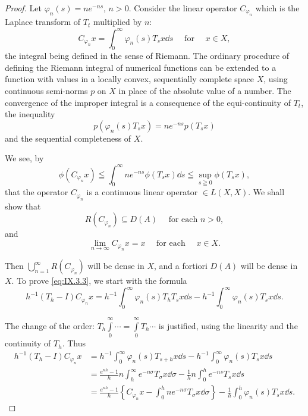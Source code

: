 \begin{proof}
 Let $\varphi_{n}(s) = ne^{-ns}$, $n > 0$. Consider the linear operator $C_{\varphi_n}$ which is the Laplace transform of $T_{t}$ multiplied by $n$: 
\begin{equation}\label{eq:IX.3.2}
C _ {\varphi_{n}} x = \int_{0} ^{\infty} \varphi_{n} (s) T _{s} x \dd s \quad \text{ for } \quad x \in X,
\end{equation}
the integral being defined in the sense of Riemann. The ordinary procedure of defining the Riemann integral of numerical functions can be extended to a function with values in a locally convex, sequentially complete space $X$, using continuous semi-norms $p$ on $X$ in place of the absolute value of a number. The convergence of the improper integral is a consequence of the equi-continuity of $T_{t}$, the inequality 
\[
p \left(\varphi_{n} (s) T _{s} x\right) = n e ^{-ns} p \left(T _{s} x\right)
\]
and the sequential completeness of $X$. 


We see, by 
\[
\phi \left(C _ {\varphi_{n}} x\right) \leqq \int_{0} ^{\infty} n e ^{-ns} \phi \left(T _{s} x\right) \dd s \leqq \sup\limits _{s \geqq 0} \phi \left(T _{s} x\right),
\]
that the operator $C_{\varphi_n}$ is a continuous linear operator $\in L(X, X)$. We shall show that 
\begin{equation}\label{eq:IX.3.3}
R \left(C _ {\varphi_{n}}\right) \subseteq D (A) \quad \text{ for each } n > 0,
\end{equation}
and 
\begin{equation}\label{eq:IX.3.4}
\lim\limits _{n \rightarrow \infty} C _ {\varphi_{n}} x = x \quad \text{ for each } \quad x \in X.
\end{equation}

Then $\bigcup\limits_{n=1}^{\infty} R(C_{\varphi_n})$ will be dense in $X$, and a fortiori $D(A)$ will be dense in $X$. To prove \eqref{eq:IX.3.3}, we start with the formula 
\[
h ^{-1} (T _{h} - I) C _ {\varphi_{n}} x = h ^{-1} \int_{0} ^{\infty} \varphi_{n} (s) T _{h} T _{s} x \dd s - h ^{-1} \int_{0} ^{\infty} \varphi_{n} (s) T _{s} x \dd s.
\]

The change of the order: $T_{h}\int\limits_{0}^{\infty}\cdots=\int\limits_{0}^{\infty}T_{h}\cdots$ is justified, using the linearity and the continuity of $T_{h}$. Thus 
\[
\begin{aligned} h ^{-1} (T _{h} - I) C _ {\varphi_{n}} x & = h ^{-1} \int_{0} ^{\infty} \varphi_{n} (s) T _{s+h} x \dd s - h ^{-1} \int_{0} ^{\infty} \varphi_{n} (s) T _{s} x \dd s \\ & = \frac {e ^{nh} - 1}{h} n \int_{h} ^{\infty} e ^{- n \sigma} T _{\sigma} x \dd \sigma - \frac {1}{h} n \int_{0} ^{h} e ^{-ns} T _{s} x \dd s \\ & = \frac {e ^{nh} - 1}{h} \left\{C _ {\varphi_{n}} x - \int_{0} ^{h} n e ^{- n \sigma} T _{\sigma} x \dd \sigma \right\} - \frac {1}{h} \int_{0} ^{h} \varphi_{n} (s) T _{s} x \dd s. \end{aligned}
\]


\end{proof}
